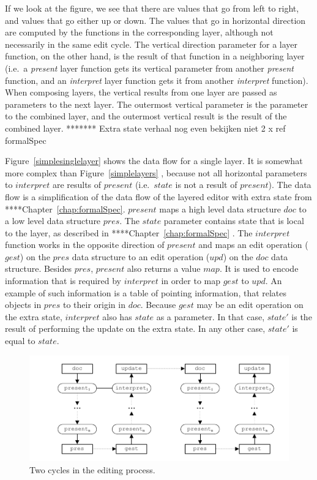 \documentclass[preprint,natbib]{sigplanconf}
\begin{document}
\bc
If we look at the figure, we see that there are values that go from left to right, and values that go either up or down. The values that go in horizontal direction are computed by the functions in the corresponding layer, although not necessarily in the same edit cycle. The vertical direction parameter for a layer function, on the other hand, is the result of that function in a neighboring layer (i.e.\ a {\em present} layer function gets its vertical parameter from another {\em present} function, and an {\em interpret} layer function gets it from another {\em interpret} function). When composing layers, the vertical results from one layer are passed as parameters to the next layer. The outermost vertical parameter is the parameter to the combined layer, and the outermost vertical result is the result of the combined layer. 
\ec
\bc
******* Extra state verhaal nog even bekijken  niet 2 x ref formalSpec

Figure~\ref{simplesinglelayer} shows the data flow for a single layer. It is somewhat more complex than Figure~\ref{simplelayers} , because not all horizontal parameters to $interpret$ are results of $present$  (i.e.\ $state$ is not a result of $present$). The data flow is a simplification of the data flow of the layered editor with extra state from ****Chapter~\ref{chap:formalSpec}. $present$ maps a high level data structure $doc$ to a low level data structure $pres$. The $state$ parameter contains state that is local to the layer, as described in ****Chapter~\ref{chap:formalSpec} . The $interpret$ function works in the opposite direction of $present$ and maps an edit operation ($gest$) on the $pres$ data structure to an edit operation ($upd$) on the $doc$ data structure. Besides $pres$, $present$ also returns a value $map$. It is used to encode information that is required by $interpret$ in order to map $gest$ to $upd$. An example of such information is a table of pointing information, that relates objects in $pres$ to their origin in $doc$. Because $gest$ may be an edit operation on the extra state, $interpret$ also has $state$ as a parameter. In that case, $state'$ is the result of performing the update on the extra state. In any other case, $state'$ is equal to $state$. 
\ec

\begin{figure}
\includegraphics[width=\columnwidth]{images/EditCycles}
\caption{Two cycles in the editing process.}\label{simpleeditprocess} 
\end{figure}
\end{document}
